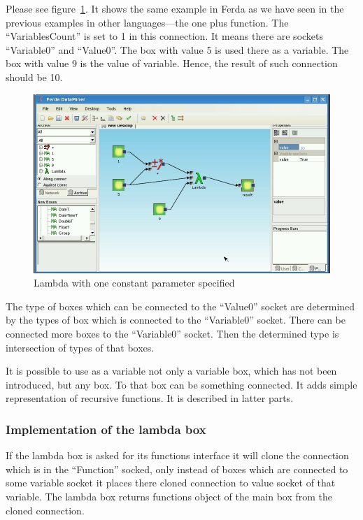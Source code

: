 \documentclass[a4paper,12pt]{book}
\begin{document}
Please see figure~\ref{fig:boxLambdaOnePlus}. It shows the same example in Ferda as we have seen in the previous examples in other languages---the one plus function. The ``VariablesCount'' is set to 1 in this connection. It means there are sockets ``Variable0'' and ``Value0''. The box with value 5 is used there as a variable. The box with value 9 is the value of variable. Hence, the result of such connection should be 10.
\begin{figure}
	\includegraphics[width=1\textwidth]{lambdaBasic3.png}
	\caption{Lambda with one constant parameter specified}
	\label{fig:boxLambdaOnePlus}
\end{figure}

The type of boxes which can be connected to the ``Value0'' socket are determined by the types of box which is connected to the ``Variable0'' socket. There can be connected more boxes to the ``Variable0'' socket. Then the determined type is intersection of types of that boxes.

It is possible to use as a variable not only a variable box, which has not been introduced, but any box. To that box can be something connected. It adds simple representation of recursive functions. It is described in latter parts.

\subsubsection{Implementation of the lambda box}
If the lambda box is asked for its functions interface it will clone the connection which is in the ``Function'' socked, only instead of boxes which are connected to some variable socket it places there cloned connection to value socket of that variable. The lambda box returns functions object of the main box from the cloned connection.
\end{document}
